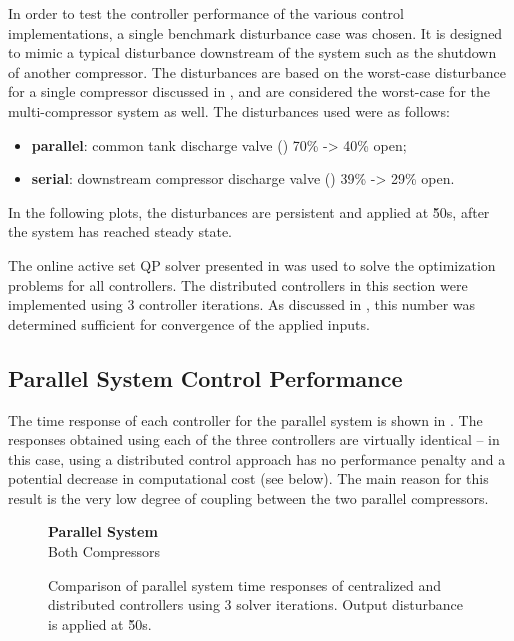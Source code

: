 In order to test the controller performance of the various control implementations, a single benchmark disturbance case was chosen.
It is designed to mimic a typical disturbance downstream of the system such as the shutdown of another compressor.
The disturbances are based on the worst-case disturbance for a single compressor discussed in \cite{Cortinovis2015}, and are considered the worst-case for the multi-compressor system as well.
The disturbances used were as follows:

\begin{itemize}
  \item \textbf{parallel}: common tank discharge valve () 70\% -> 40\% open;
  \item \textbf{serial}: downstream compressor discharge valve () 39\% -> 29\% open.
\end{itemize}
In the following plots, the disturbances are persistent and applied at \u{50}{s}, after the system has reached steady state.

The online active set QP solver \qpoases{} presented in \cite{Ferreau2014} was used to solve the optimization problems for all controllers.
The distributed controllers in this section were implemented using 3 controller iterations. 
As discussed in \cite{Jones2016}, this number was determined sufficient for convergence of the applied inputs.

\subsection{Parallel System Control Performance}
The time response of each controller for the parallel system is shown in .
The responses obtained using each of the three controllers are virtually identical -- in this case, using a distributed control approach has no performance penalty and a potential decrease in computational cost (see below).
The main reason for this result is the very low degree of coupling between the two parallel compressors.


\begin{figure}
  {\centering\small\textbf{Parallel System}\\Both Compressors\\[0.5em]}
  \resizebox{\linewidth}{!}{%
    
  }
  \caption[Time response of parallel system.]{Comparison of parallel system time responses of centralized and distributed controllers using 3 solver iterations. Output disturbance is applied at \u{50}{s}.}
  \label{fig:res:parallel-timeresp}
\end{figure}

